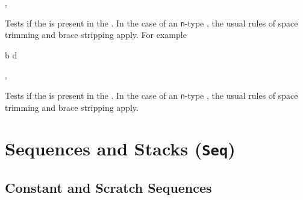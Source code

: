 \documentclass[oneside]{book}
\begin{document}
\begin{function}{\ClistIfIn,\ClistIfInTF}
\begin{syntax}
  
    
\end{syntax}
Tests if the  is present in the .
In the case of an \texttt{n}-type , the usual rules
of space trimming and brace stripping apply. For example
\begin{demohigh}
 {b} {} {}
 {d} {} {}
\end{demohigh}
\end{function}

\begin{function}{\ClistVarIfIn,\ClistVarIfInTF}
\begin{syntax}
  
    
\end{syntax}
Tests if the  is present in the .
In the case of an \texttt{n}-type , the usual rules
of space trimming and brace stripping apply.
\begin{demohigh}
\ClistSet {}
\ClistVarIfInTF {} {} {}
\ClistVarIfInTF {} {} {}
\end{demohigh}
\end{function}

\chapter{Sequences and Stacks (\texttt{Seq})}

\section{Constant and Scratch Sequences}
\end{document}
